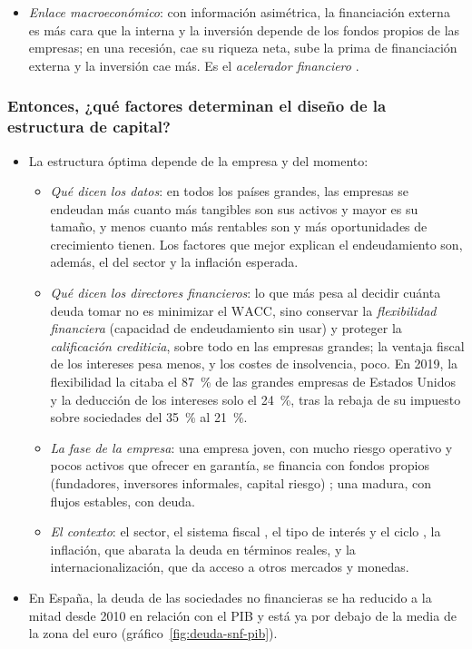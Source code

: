 \documentclass[11pt]{article}
\begin{document}
\begin{itemize}
\item \emph{Enlace macroeconómico}: con información asimétrica, la financiación externa es más cara que la interna y la inversión depende de los fondos propios de las empresas; en una recesión, cae su riqueza neta, sube la prima de financiación externa y la inversión cae más. Es el \emph{acelerador financiero}\nocite{BernankeGertler1989Agency}  .
\end{itemize}

\subsubsection{Entonces, ¿qué factores determinan el diseño de la estructura de capital?}\label{sec:factores}

\begin{itemize}
\item La estructura óptima depende de la empresa y del momento:
  \begin{itemize}
  \item \emph{Qué dicen los datos}: en todos los países grandes, las empresas se endeudan más cuanto más tangibles son sus activos y mayor es su tamaño, y menos cuanto más rentables son y más oportunidades de crecimiento tienen\nocite{RajanZingales1995What}. Los factores que mejor explican el endeudamiento son, además, el del sector y la inflación esperada\nocite{FrankGoyal2009Capital}.
  \item \emph{Qué dicen los directores financieros}: lo que más pesa al decidir cuánta deuda tomar no es minimizar el $\mathrm{WACC}$, sino conservar la \emph{flexibilidad financiera} (capacidad de endeudamiento sin usar) y proteger la \emph{calificación crediticia}, sobre todo en las empresas grandes; la ventaja fiscal de los intereses pesa menos, y los costes de insolvencia, poco\nocite{GrahamHarvey2001Theory}. En 2019, la flexibilidad la citaba el 87~\% de las grandes empresas de Estados Unidos y la deducción de los intereses solo el 24~\%, tras la rebaja de su impuesto sobre sociedades del 35~\% al 21~\%\nocite{Graham2022Presidential}.
  \item \emph{La fase de la empresa}: una empresa joven, con mucho riesgo operativo y pocos activos que ofrecer en garantía, se financia con fondos propios (fundadores, inversores informales, capital riesgo) ; una madura, con flujos estables, con deuda.
  \item \emph{El contexto}: el sector, el sistema fiscal , el tipo de interés y el ciclo , la inflación, que abarata la deuda en términos reales, y la internacionalización, que da acceso a otros mercados y monedas.
  \end{itemize}
\item En España, la deuda de las sociedades no financieras se ha reducido a la mitad desde 2010 en relación con el PIB y está ya por debajo de la media de la zona del euro\nocite{BCE2026QSA} (gráfico~\ref{fig:deuda-snf-pib}).
\end{itemize}
\end{document}

